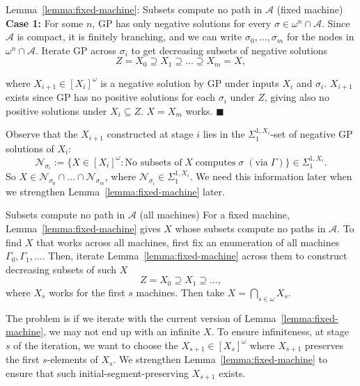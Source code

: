 \begin{frame}{Lemma~\ref{lemma:fixed-machine}: Subsets compute no path in
$\mathcal{A}$ (fixed machine)}
  \textbf{Case 1:} For some $n$, GP has only negative solutions for every
  $\sigma\in\omega^n\cap\mathcal{A}$. Since $\mathcal{A}$ is compact, it is
  finitely branching, and we can write $\sigma_0,\ldots,\sigma_m$ for the
  nodes in $\omega^n\cap\mathcal{A}$. Iterate GP across $\sigma_i$ to get
  decreasing subsets of negative solutions
  \[Z=X_0 \supseteq X_1 \supseteq \ldots\supseteq X_m=X,\]

  where $X_{i+1}\in[X_i]^\omega$ is a negative solution by GP under
  inputs $X_i$ and $\sigma_i$. $X_{i+1}$ exists since GP has no positive
  solutions for each $\sigma_i$ under $Z$, giving also no
  positive solutions under $X_i\subseteq Z$. $X=X_m$ works. $\blacksquare$

  \vspace{0.5em}
  Observe that the $X_{i+1}$ constructed at stage $i$ lies in the
  $\Sigma_1^{1,X_i}$-set of negative GP solutions of $X_i$:
  \[\mathcal{N}_{\sigma_i}:= \{X\in[X_i]^\omega: \text{No subsets of}\; X\;
  \text{computes}\; \sigma\; (\text{via}\; \Gamma)\}
  \in\Sigma_1^{1,X_i}.\]
  So $X \in\mathcal{N}_{\sigma_0}\cap\ldots\cap\mathcal{N}_{\sigma_m}$,
  where $\mathcal{N}_{\sigma_i}\in\Sigma_1^{1,X_i}$. We need this
  information later when we strengthen Lemma~\ref{lemma:fixed-machine}
  later.
\end{frame}

\begin{frame}{Subsets compute no path in $\mathcal{A}$ (all
machines)}
  For a fixed machine, Lemma~\ref{lemma:fixed-machine} gives $X$ whose
  subsets compute no paths in $\mathcal{A}$. To find $X$ that works across
  all machines, first fix an enumeration of all machines
  $\Gamma_0,\Gamma_1,\ldots$. Then, iterate Lemma~\ref{lemma:fixed-machine}
  across them to construct decreasing subsets of such $X$
  \[Z= X_0\supseteq X_1\supseteq \ldots,\]
  where $X_s$ works for the first $s$ machines. Then take
  $X=\bigcap_{s\in\omega}X_s$.

  \vspace{1em}
  The problem is if we iterate with the current version of
  Lemma~\ref{lemma:fixed-machine}, we may not end up with an infinite $X$.
  To ensure infiniteness, at stage $s$ of the iteration, we want to choose
  the $X_{s+1}\in[X_s]^\omega$ where $X_{s+1}$ preserves the first
  $s$-elements of $X_s$. We strengthen Lemma~\ref{lemma:fixed-machine} to
  ensure that such initial-segment-preserving $X_{s+1}$ exists.
\end{frame}

